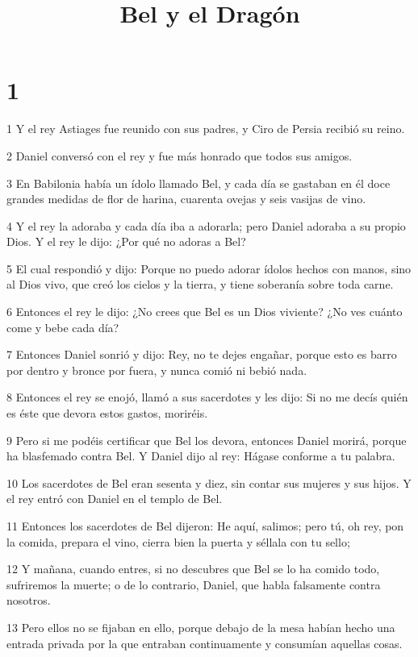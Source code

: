 

\title{Bel y el Dragón}

\chapter{1}

\par 1 Y el rey Astiages fue reunido con sus padres, y Ciro de Persia recibió su reino.
\par 2 Daniel conversó con el rey y fue más honrado que todos sus amigos.
\par 3 En Babilonia había un ídolo llamado Bel, y cada día se gastaban en él doce grandes medidas de flor de harina, cuarenta ovejas y seis vasijas de vino.
\par 4 Y el rey la adoraba y cada día iba a adorarla; pero Daniel adoraba a su propio Dios. Y el rey le dijo: ¿Por qué no adoras a Bel?
\par 5 El cual respondió y dijo: Porque no puedo adorar ídolos hechos con manos, sino al Dios vivo, que creó los cielos y la tierra, y tiene soberanía sobre toda carne.
\par 6 Entonces el rey le dijo: ¿No crees que Bel es un Dios viviente? ¿No ves cuánto come y bebe cada día?
\par 7 Entonces Daniel sonrió y dijo: Rey, no te dejes engañar, porque esto es barro por dentro y bronce por fuera, y nunca comió ni bebió nada.
\par 8 Entonces el rey se enojó, llamó a sus sacerdotes y les dijo: Si no me decís quién es éste que devora estos gastos, moriréis.
\par 9 Pero si me podéis certificar que Bel los devora, entonces Daniel morirá, porque ha blasfemado contra Bel. Y Daniel dijo al rey: Hágase conforme a tu palabra.
\par 10 Los sacerdotes de Bel eran sesenta y diez, sin contar sus mujeres y sus hijos. Y el rey entró con Daniel en el templo de Bel.
\par 11 Entonces los sacerdotes de Bel dijeron: He aquí, salimos; pero tú, oh rey, pon la comida, prepara el vino, cierra bien la puerta y séllala con tu sello;
\par 12 Y mañana, cuando entres, si no descubres que Bel se lo ha comido todo, sufriremos la muerte; o de lo contrario, Daniel, que habla falsamente contra nosotros.
\par 13 Pero ellos no se fijaban en ello, porque debajo de la mesa habían hecho una entrada privada por la que entraban continuamente y consumían aquellas cosas.
